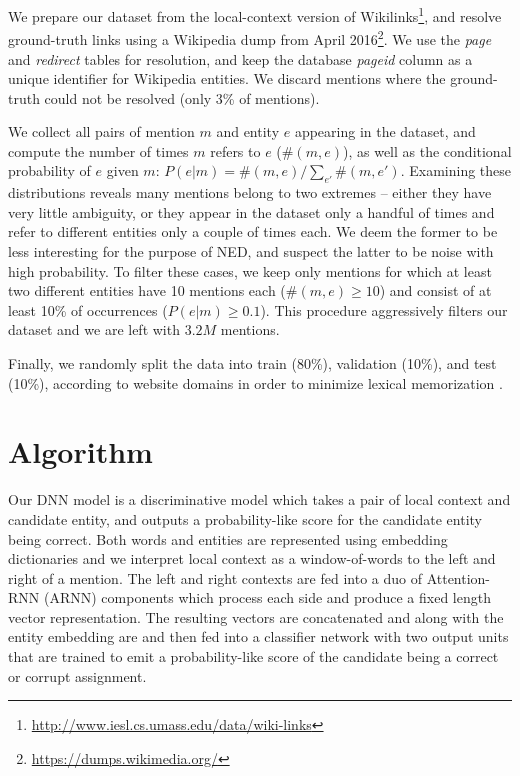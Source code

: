 \documentclass[11pt,a4paper]{article}
\begin{document}
	We prepare our dataset from the local-context version of Wikilinks\footnote{\url{http://www.iesl.cs.umass.edu/data/wiki-links}}, and resolve ground-truth links using a Wikipedia dump from April 2016\footnote{\url{https://dumps.wikimedia.org/}}. We use the \emph{page} and \emph{redirect} tables for resolution, and keep the database \emph{pageid} column as a unique identifier for Wikipedia entities. We discard mentions where the ground-truth could not be resolved (only 3\% of mentions).
	
	We collect all pairs of mention $m$ and entity $e$ appearing in the dataset, and compute the number of times $m$ refers to $e$ ($\#(m,e)$), as well as the conditional probability of $e$ given $m$: $P(e|m)=\#(m,e)/\sum_{e'}\#(m,e')$. Examining these distributions reveals many mentions belong to two extremes -- either they have very little ambiguity, or they appear in the dataset only a handful of times and refer to different entities only a couple of times each. We deem the former to be less interesting for the purpose of NED, and suspect the latter to be noise with high probability. To filter these cases, we keep only mentions for which at least two different entities have 10 mentions each ($\#(m,e) \ge 10$) and consist of at least 10\% of occurrences ($P(e|m) \ge 0.1$). This procedure aggressively filters our dataset and we are left with $3.2M$ mentions.
	
	Finally, we randomly split the data into train (80\%), validation (10\%), and test (10\%), according to website domains in order to minimize lexical memorization \cite{levy2015supervised}.
	
	
	\section{Algorithm}
	
	Our DNN model is a discriminative model which takes a pair of local context and candidate entity, and outputs a probability-like score for the candidate entity being correct. Both words and entities are represented using embedding dictionaries and we interpret local context as a window-of-words to the left and right of a mention. The left and right contexts are fed into a duo of Attention-RNN (ARNN) components which process each side and produce a fixed length vector representation. The resulting vectors are concatenated and along with the entity embedding are and then fed into a classifier network with two output units that are trained to emit a probability-like score of the candidate being a correct or corrupt assignment. 
	
\end{document}
